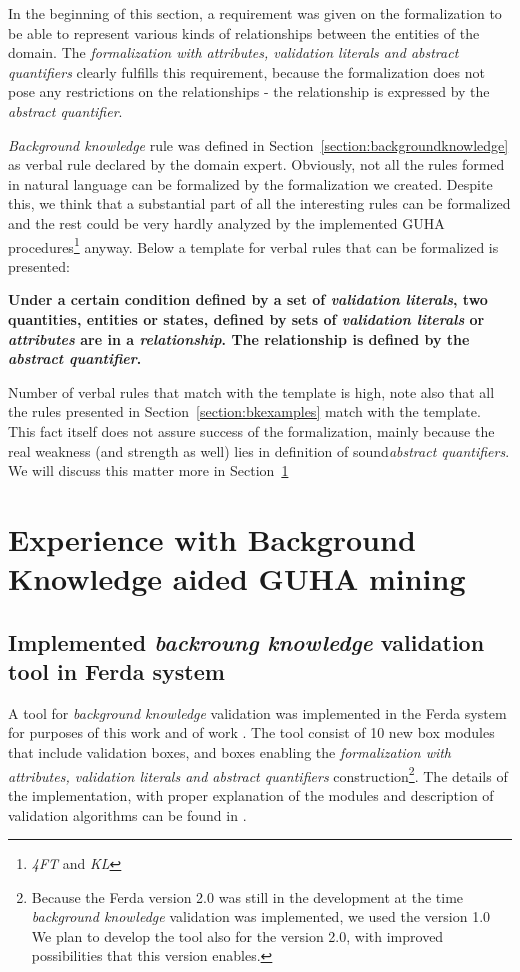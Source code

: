 \documentclass{llncs}
\begin{document}
In the beginning of this section, a requirement was given on the formalization
to be able to represent various kinds of relationships between the
entities of the domain. The \emph{formalization with attributes, validation 
literals and abstract quantifiers} clearly fulfills this requirement, because the
formalization does not pose any restrictions on the relationships - 
the relationship is expressed by the \emph{abstract quantifier}. 

\emph{Background knowledge} rule was defined in Section~\ref{section:backgroundknowledge}
as verbal rule declared by the domain expert. Obviously, not all the rules formed in natural
language can be formalized by the formalization we created. Despite this, we think that
a substantial part of all the interesting rules can be formalized and the rest could be
very hardly analyzed by the implemented GUHA procedures\footnote{\emph{4FT} and \emph{KL}}
anyway. Below a template for verbal rules that can be formalized is presented:

\medskip
\textbf{Under a certain condition defined by a set of \emph{validation literals},
two quantities, entities or states, defined by sets of \emph{validation literals}
or \emph{attributes} are in a \emph{relationship}. The relationship is defined by
the \emph{abstract quantifier}.}

\medskip
Number of verbal rules that match with the template is high, note also that all
the rules presented in Section~\ref{section:bkexamples} match with the template.
This fact itself does not assure success of the formalization, mainly because the
real weakness (and strength as well) lies in definition of sound\emph{abstract
quantifiers}. We will discuss this matter more in Section~\ref{section:mining}

\section{Experience with Background Knowledge aided GUHA mining}
\label{section:mining}

\subsection{Implemented \emph{backroung knowledge} validation tool in Ferda system}
A tool for \emph{background knowledge} validation was implemented in the Ferda system for
purposes of this work and of work \cite{Diplomka}.
The tool consist of 10 new box modules that include validation boxes, and boxes enabling
the \emph{formalization with attributes, validation literals and abstract quantifiers}
construction\footnote{Because the Ferda version 2.0 was still in the development at
the time \emph{background knowledge} validation was implemented, we used the version 1.0 
We plan to develop the tool also for the version 2.0, with improved possibilities that
this version enables.}.
The details of the implementation, with proper explanation of the modules
and description of validation algorithms can be found in \cite{Diplomka}.
\end{document}
